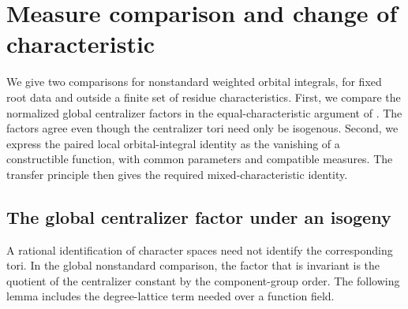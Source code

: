 \section{Measure comparison and change of characteristic}
\label{sec:nonstandard-transfer}

We give two comparisons for nonstandard weighted orbital integrals,
for fixed root data and outside a finite set of residue characteristics.
First, we compare the normalized
global centralizer factors in the equal-characteristic argument of
\citet[Theorem~17.7]{HalleckDubeWFLDraft}.  The factors agree even though
the centralizer tori need only be isogenous.  Second, we express the
paired local orbital-integral identity as the vanishing of a
constructible function, with common parameters and compatible measures.
The transfer principle then gives the required mixed-characteristic
identity.

\subsection{The global centralizer factor under an isogeny}
\label{subsec:global-torus-factor}

A rational identification of character spaces need not identify the
corresponding tori.  In the global nonstandard comparison, the factor
that is invariant is the quotient of the centralizer constant by the
component-group order.  The following lemma includes the degree-lattice
term needed over a function field.

